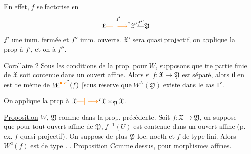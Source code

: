 En effet, $f$ se factorise en
\[
\mathfrak X\overset{f'}{\unsure{\text{---}|\longrightarrow}}
\mathfrak X'\overset{f''}{\text{---}}\mathfrak Y
\]
 $f'$ une imm. fermée et $f''$ imm. ouverte. $\mathfrak X'$ sera  quasi projectif, on
applique la prop à $f'$, et on   à $f''$.

 \uline{Corollaire 2} Sous les conditions de la prop. pour $\underline W$,  supposons que  tte partie finie de $\mathfrak X$ soit contenue dans un ouvert affine. Alors si $f:\mathfrak X\to\mathfrak Y$ est séparé, alors il en est de même de $\underline W^{\unsure{\bullet|a}}(f)$ [sous réserve que $\underline W^\wedge(\mathfrak Y)$ existe dans le cas $\mathrm I'$].

On applique la prop à $\mathfrak X\unsure{\text{---}|\longrightarrow}\mathfrak X\times_{\mathfrak Y}\mathfrak X$.

\uline{Proposition} $W$,  $\mathfrak Y$ comme dans la prop. précédente. Soit $f:\mathfrak X\to\mathfrak Y$, on suppose   que pour tout ouvert affine  de $\mathfrak Y$,  $f^{-1}(U)$ est  contenue dans un ouvert affine (p. ex. $f$ quasi-projectif). On suppose de plus $\mathfrak Y$ loc. noeth et  $f$ de type fini.  Alors $\underline W^{a}(f)$ est de type  .
.
\uline{Proposition} Comme dessus, pour morphismes \uline{affines}.

